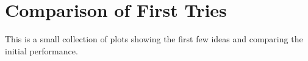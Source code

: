 \newpage
\section*{Comparison of First Tries}
This is a small collection of plots showing the first few ideas and comparing the initial performance. 